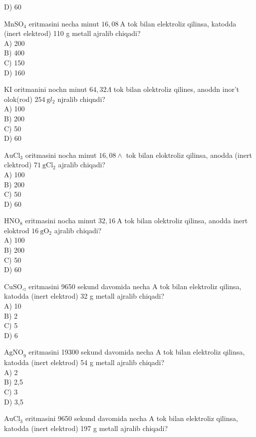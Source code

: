 D) 60
  \item $\mathrm{MnSO}_{4}$ eritmasini necha minut $16,08 \mathrm{~A}$ tok bilan elektroliz qilinsa, katodda (inert elektrod) 110 g metall ajralib chiqadi?\\
A) 200\\
B) 400\\
C) 150\\
D) 160
  \item KI oritmanini nochn minut $64,32 \Lambda$ tok bilan olektroliz qilines, anoddn inor't olok(rod) $254 \mathrm{~g} l_{2}$ njralib chiqndi?\\
A) 100\\
B) 200\\
C) 50\\
D) 60
  \item $\mathrm{AuCl}_{3}$ oritmasini nocha minut $16,08 \wedge$ tok bilan eloktroliz qilinsa, anodda (inert clektrod) $71 \mathrm{~g} \mathrm{Cl}_{2}$ ajralib chiqadi?\\
A) 100\\
B) 200\\
C) 50\\
D) 60
  \item $\mathrm{HNO}_{8}$ eritmasini nocha minut $32,16 \mathrm{~A}$ tok bilan olektroliz qilinsa, anodda inert eloktrod $16 \mathrm{~g} \mathrm{O}_{2}$ ajralib chiqadi?\\
A) 100\\
B) 200\\
C) 50\\
D) 60
  \item $\mathrm{CuSO}_{\triangleleft}$ eritmasini 9650 sekund davomida necha A tok bilan elektroliz qilinsa, katodda (inert elektrod) 32 g metall ajralib chiqadi?\\
A) 10\\
B) 2\\
C) 5\\
D) 6\\
  \item $\mathrm{AgNO}_{9}$ eritmasini 19300 sekund davomida necha A tok bilan elektroliz qilinsa, katodda (inert elektrod) 54 g metall ajralib chiqadi?\\
A) 2\\
B) 2,5\\
C) 3\\
D) 3,5
  \item $\mathrm{AuCl}_{3}$ eritmasini 9650 sekund davomida necha A tok bilan elektroliz qilinsa, katodda (inert elektrod) 197 g metall ajralib chiqadi?\\
